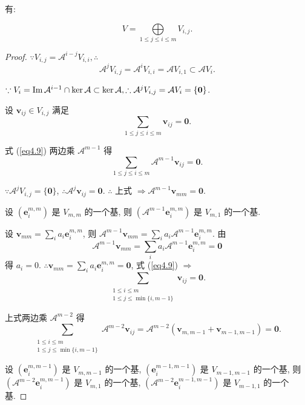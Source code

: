 \documentclass[color=black,device=normal,lang=cn,mode=geye]{elegantnote}
\begin{document}
有:
\begin{theorem}\label{t4.3}
    \[V=\bigoplus\limits_{1\leq j\leq i\leq m}V_{i,j}.\]
\end{theorem}
\begin{proof}
    $\because V_{i,j}=\mathcal{A}^{i-j}V_{i,i},\therefore$
    \[\mathcal{A}^jV_{i,j}=\mathcal{A}^iV_{i,i}=\mathcal{A}V_{i,1}\subset\mathcal{A}V_i.\]

    $\because V_i=\operatorname{Im} \mathcal{A}^{i-1}\cap\ker\mathcal{A}\subset\ker\mathcal{A},\therefore\mathcal{A}^jV_{i,j}=\mathcal{A}V_i=\{\boldsymbol{0}\}$.

    设 $\boldsymbol{v}_{ij}\in V_{i,j}$ 满足
    \begin{equation}\label{eq4.9}
        \sum\limits_{1\leq j\leq i\leq m}\boldsymbol{v}_{ij}=\boldsymbol{0}.
    \end{equation}

    式 (\ref{eq4.9}) 两边乘 $\mathcal{A}^{m-1}$ 得
    \[\sum\limits_{1\leq j\leq i\leq m}\mathcal{A}^{m-1}\boldsymbol{v}_{ij}=\boldsymbol{0}.\]

    $\because\mathcal{A}^jV_{i,j}=\{\boldsymbol{0}\}$, $\therefore\mathcal{A}^j\boldsymbol{v}_{ij}=\boldsymbol{0}$. $\therefore$ 上式 $\Rightarrow\mathcal{A}^{m-1}\boldsymbol{v}_{mm}=\boldsymbol{0}$.

    设 $(\boldsymbol{e}_i^{m,m})$ 是 $V_{m,m}$ 的一个基, 则 $(\mathcal{A}^{m-1}\boldsymbol{e}_i^{m,m})$ 是 $V_{m,1}$ 的一个基.
    
    设 $\boldsymbol{v}_{mm}=\sum\limits_ia_i\boldsymbol{e}_i^{m,m}$, 则 $\mathcal{A}^{m-1}\boldsymbol{v}_{mm}=\sum\limits_ia_i\mathcal{A}^{m-1}\boldsymbol{e}_i^{m,m}$. 由
    \[\mathcal{A}^{m-1}\boldsymbol{v}_{mm}=\sum\limits_ia_i\mathcal{A}^{m-1}\boldsymbol{e}_i^{m,m}=\boldsymbol{0}\]
    得 $a_i=0$. $\therefore \boldsymbol{v}_{mm}=\sum\limits_ia_i\boldsymbol{e}_i^{m,m}=\boldsymbol{0}$, 式 (\ref{eq4.9}) $\Rightarrow$
    \[\sum\limits_{\substack{1\leq i\leq m\\1\leq j\leq\min\{i,m-1\}}}\boldsymbol{v}_{ij}=\boldsymbol{0}.\]
    
    上式两边乘 $\mathcal{A}^{m-2}$ 得
    \[\sum\limits_{\substack{1\leq i\leq m\\1\leq j\leq\min\{i,m-1\}}}\mathcal{A}^{m-2}\boldsymbol{v}_{ij}=\mathcal{A}^{m-2}(\boldsymbol{v}_{m,m-1}+\boldsymbol{v}_{m-1,m-1})=\boldsymbol{0}.\]

    设 $(\boldsymbol{e}_i^{m,m-1})$ 是 $V_{m,m-1}$ 的一个基, $(\boldsymbol{e}_i^{m-1,m-1})$ 是 $V_{m-1,m-1}$ 的一个基, 则 $(\mathcal{A}^{m-2}\boldsymbol{e}_i^{m,m-1})$ 是 $V_{m,1}$ 的一个基, $(\mathcal{A}^{m-2}\boldsymbol{e}_i^{m-1,m-1})$ 是 $V_{m-1,1}$ 的一个基.


\end{proof}
\end{document}
